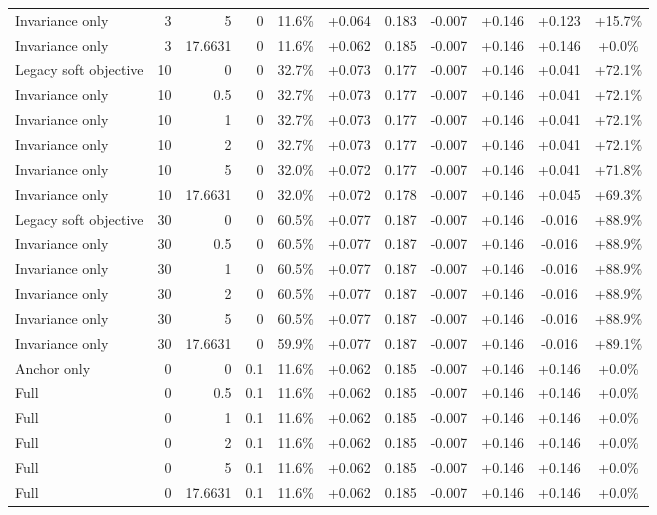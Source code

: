 \begin{table}[htbp]
\begin{tabular}{lrrrccccccc}
Invariance only & 3 & 5 & 0 & 11.6\% & +0.064 & 0.183 & -0.007 & +0.146 & +0.123 & +15.7\% \\
Invariance only & 3 & 17.6631 & 0 & 11.6\% & +0.062 & 0.185 & -0.007 & +0.146 & +0.146 & +0.0\% \\
Legacy soft objective & 10 & 0 & 0 & 32.7\% & +0.073 & 0.177 & -0.007 & +0.146 & +0.041 & +72.1\% \\
Invariance only & 10 & 0.5 & 0 & 32.7\% & +0.073 & 0.177 & -0.007 & +0.146 & +0.041 & +72.1\% \\
Invariance only & 10 & 1 & 0 & 32.7\% & +0.073 & 0.177 & -0.007 & +0.146 & +0.041 & +72.1\% \\
Invariance only & 10 & 2 & 0 & 32.7\% & +0.073 & 0.177 & -0.007 & +0.146 & +0.041 & +72.1\% \\
Invariance only & 10 & 5 & 0 & 32.0\% & +0.072 & 0.177 & -0.007 & +0.146 & +0.041 & +71.8\% \\
Invariance only & 10 & 17.6631 & 0 & 32.0\% & +0.072 & 0.178 & -0.007 & +0.146 & +0.045 & +69.3\% \\
Legacy soft objective & 30 & 0 & 0 & 60.5\% & +0.077 & 0.187 & -0.007 & +0.146 & -0.016 & +88.9\% \\
Invariance only & 30 & 0.5 & 0 & 60.5\% & +0.077 & 0.187 & -0.007 & +0.146 & -0.016 & +88.9\% \\
Invariance only & 30 & 1 & 0 & 60.5\% & +0.077 & 0.187 & -0.007 & +0.146 & -0.016 & +88.9\% \\
Invariance only & 30 & 2 & 0 & 60.5\% & +0.077 & 0.187 & -0.007 & +0.146 & -0.016 & +88.9\% \\
Invariance only & 30 & 5 & 0 & 60.5\% & +0.077 & 0.187 & -0.007 & +0.146 & -0.016 & +88.9\% \\
Invariance only & 30 & 17.6631 & 0 & 59.9\% & +0.077 & 0.187 & -0.007 & +0.146 & -0.016 & +89.1\% \\
Anchor only & 0 & 0 & 0.1 & 11.6\% & +0.062 & 0.185 & -0.007 & +0.146 & +0.146 & +0.0\% \\
Full & 0 & 0.5 & 0.1 & 11.6\% & +0.062 & 0.185 & -0.007 & +0.146 & +0.146 & +0.0\% \\
Full & 0 & 1 & 0.1 & 11.6\% & +0.062 & 0.185 & -0.007 & +0.146 & +0.146 & +0.0\% \\
Full & 0 & 2 & 0.1 & 11.6\% & +0.062 & 0.185 & -0.007 & +0.146 & +0.146 & +0.0\% \\
Full & 0 & 5 & 0.1 & 11.6\% & +0.062 & 0.185 & -0.007 & +0.146 & +0.146 & +0.0\% \\
Full & 0 & 17.6631 & 0.1 & 11.6\% & +0.062 & 0.185 & -0.007 & +0.146 & +0.146 & +0.0\% \\

\end{tabular}
\end{table}
